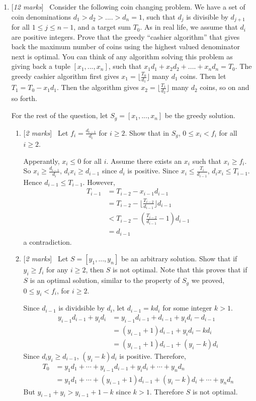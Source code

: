 \documentclass[11pt]{article}
\newcommand{\Q}[1]{\medskip\item {[{\em #1 marks\/}]}\ }
\begin{document}
\begin{enumerate}
\newpage
\Q{12} Consider the following coin changing problem. We have a set of coin denominations $d_1 > d_2 > .... >d_n = 1$, such that $d_{j}$ is divisible by $d_{j+1}$ for all $1 \le j \le n-1$, and a target sum $T_0$. As in real life, we assume that $d_i$ are positive integers. Prove that the greedy ``cashier algorithm'' that gives back the maximum number of coins using the highest valued denominator next is optimal. You can think of any algorithm solving this problem as giving back a tuple $[x_1, ..., x_n]$, such that  $x_1d_1 + x_2d_2 + .... + x_nd_n=T_0$. The greedy cashier algorithm first gives $x_1 = \lfloor \frac{T_0}{d_1}\rfloor$ many $d_1$ coins. Then let $T_1 = T_0 - x_1d_1$. Then the algorithm gives $x_2=\lfloor \frac{T_1}{d_2}\rfloor$ many $d_2$ coins, so on and so forth.

For the rest of the question, let $S_g=[x_1, ..., x_n]$ be the greedy solution.  
\begin{enumerate}
\Q{2} Let $f_i = \frac{d_{i-1}}{d_i}$ for $i \ge 2$. Show that in $S_g$, $0 \le x_i < f_i$ for all $i \ge 2$.

Apperantly, $x_i \leq 0$ for all $i$. Assume there exists an $x_i$ such that $x_i \geq f_i$. So 
$x_i \geq \frac{d_{i - 1}}{d_i}$, $d_i x_i \geq d_{i - 1}$ since $d_i$ is positive. Since $x_i \leq 
\frac {T_i} {d_{i - 1}}$, $d_i x_i \leq T_{i - 1}$. Hence $d_{i - 1} \leq T_{i - 1}$. However, 
\begin{align*}
    T_{i - 1} & = T_{i - 2} - x_{i - 1} d_{i - 1}\\
    & =  T_{i - 2} - \lfloor \frac {T_{i - 2}} {d_{i - 1}} \rfloor d_{i - 1}\\
    & < T_{i - 2} - (\frac {T_{i - 2}} {d_{i - 1}} - 1)  d_{i - 1}\\
    & = d_{i - 1}
\end{align*}
 a contradiction. 

\Q{2} Let $S=[y_1, ..., y_n]$ be an arbitrary solution. Show that if $y_i \ge f_i$ for any $i \ge 2$, then $S$ is not optimal. Note that this proves that if $S$ is an optimal solution, similar to the property of $S_g$ we proved, $0 \le y_i < f_i$, for $i \ge 2$. 

Since $d_{i - 1}$ is dividsible by $d_i$, let $d_{i - 1} = k d_i$ for some integer $k > 1$. 
\begin{align*}
    y_{i - 1} d_{i - 1} + y_i d_i & = y_{i - 1} d_{i - 1} + d_{i - 1} + y_i d_i - d_{i - 1}\\
    & = ( y_{i - 1} + 1) d_{i - 1} + y_i d_i - k d_i\\
    & = ( y_{i - 1} + 1) d_{i - 1} + (y_i - k) d_i
\end{align*}
Since $d_i y_i \geq d_{i - 1}$, $(y_i - k) d_i$ is positive.
Therefore, 
\begin{align*}
    T_0 & = y_1 d_1 + \cdots + y_{i - 1} d_{i - 1} + y_i d_i + \cdots + y_n d_n\\
    & = y_1 d_1 + \cdots + ( y_{i - 1} + 1) d_{i - 1} + (y_i - k) d_i + \cdots + y_n d_n
\end{align*}
But $y_{i - 1} + y_i > y_{i - 1} + 1 - k$ since $k > 1$. Therefore $S$ is not optimal.



\end{enumerate}
\end{enumerate}
\end{document}
